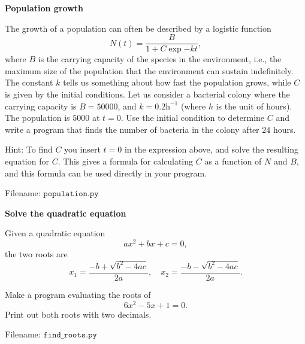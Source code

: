 \begin{Problem}{\textbf{Population growth}}\label{prob13}

\noindent The growth of a population can often be described by a logistic function
\begin{equation*}
N(t) = \frac{B}{1 + C \exp{-kt}},
\end{equation*}
where $B$ is the carrying capacity of the species in the environment, i.e., the
maximum size of the population that the environment can sustain indefinitely.
The constant $k$ tells us something about how fast the population grows, while $C$ is given
by the initial conditions. Let us consider a bacterial colony where the carrying
capacity is $B = 50 000$, and $k = 0.2\mathrm{h^{-1}}$ (where $h$ is the unit of hours). The population is
$5000$ at $t = 0$. Use the initial condition to determine $C$
and write a program that finds the number of bacteria in the colony after $24$ hours.

Hint: To find $C$ you insert $t=0$ in the expression above, and solve the resulting
equation for $C$. This gives a formula for calculating $C$ as a function of $N$ and
$B$, and this formula can be used directly in your program.

Filename: $\texttt{population.py}$
\end{Problem}

\begin{Problem}{\textbf{Solve the quadratic equation}}\label{prob14}

\noindent Given a quadratic equation
\begin{equation*}
ax^2 +bx + c = 0,
\end{equation*}
the two roots are
\begin{equation*}
x_1 = \frac{-b + \sqrt{b^2 - 4ac}}{2a}, \quad x_2 = \frac{-b - \sqrt{b^2 - 4ac}}{2a}.
\end{equation*}

Make a program evaluating the roots of
\begin{equation*}
6x^2 - 5x + 1 = 0.
\end{equation*}
Print out both roots with two decimals.

Filename: $\texttt{find\_roots.py}$
\end{Problem}


